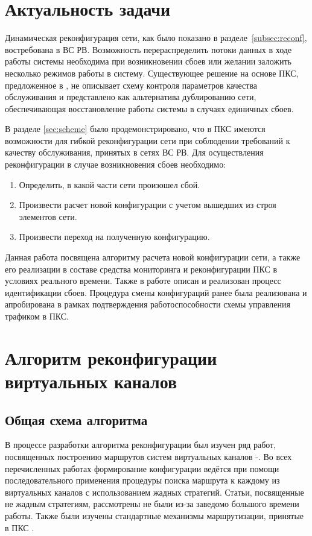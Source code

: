 \documentclass[12pt, a4paper]{article}
\begin{document}
\section{Актуальность задачи}
Динамическая реконфигурация сети, как было показано в разделе~\ref{subsec:reconf}, востребована в ВС РВ. Возможность перераспределить потоки данных в ходе работы системы необходима при возникновении сбоев или желании заложить несколько режимов работы в систему. Существующее решение на основе ПКС, предложенное в \cite{fakevlsdn}, не описывает схему контроля параметров качества обслуживания и представлено как альтернатива дублированию сети, обеспечивающая восстановление работы системы в случаях единичных сбоев. 

В разделе \ref{sec:scheme} было продемонстрировано, что в ПКС имеются возможности для гибкой реконфигурации сети при соблюдении требований к качеству обслуживания, принятых в сетях ВС РВ. Для осуществления реконфигурации в случае возникновения сбоев необходимо:
\begin{enumerate}
	\item Определить, в какой части сети произошел сбой.
	\item Произвести расчет новой конфигурации с учетом вышедших из строя элементов сети.
	\item Произвести переход на полученную конфигурацию.
\end{enumerate}

Данная работа посвящена алгоритму расчета новой конфигурации сети, а также его реализации в составе средства мониторинга и реконфигурации ПКС в условиях реального времени. Также в работе описан и реализован процесс идентификации сбоев. Процедура смены конфигураций ранее была реализована и апробирована в рамках подтверждения работоспособности схемы управления трафиком в ПКС.

\section{Алгоритм реконфигурации виртуальных каналов} \label{sec:alg}
\subsection{Общая схема алгоритма}

В процессе разработки алгоритма реконфигурации был изучен ряд работ, посвященных построению маршрутов систем виртуальных каналов \cite{alg1}-\cite{vdovinalg}. Во всех перечисленных работах формирование конфигурации ведётся при помощи последовательного применения процедуры поиска маршрута к каждому из виртуальных каналов с использованием жадных стратегий. Статьи, посвященные не жадным стратегиям, рассмотрены не были из-за заведомо большого времени работы. Также были изучены стандартные механизмы маршрутизации, принятые в ПКС \cite{algsdn}.
\end{document}
